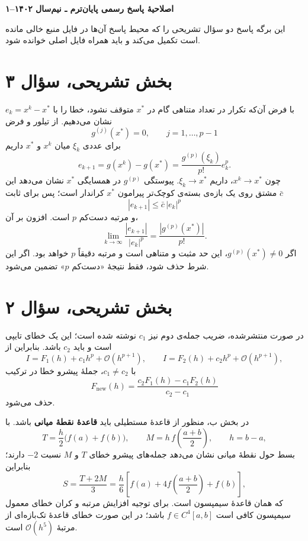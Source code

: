 \documentclass[12pt]{article}
\begin{document}
\begin{center}
  {\Large\textbf{اصلاحیهٔ پاسخ رسمی پایان‌ترم ـ نیم‌سال ۱۴۰۲--۱}}
\end{center}

این برگه پاسخ دو سؤال تشریحی را که محیط پاسخ آن‌ها در فایل  منبع خالی مانده است تکمیل می‌کند و باید همراه فایل اصلی خوانده شود.

\section*{بخش تشریحی، سؤال ۳}
با فرض آن‌که تکرار در تعداد متناهی گام در
\(x^*\)
متوقف نشود، خطا را با
\(e_k=x^k-x^*\)
نشان می‌دهیم. از تیلور و فرض
\[
 g^{(j)}(x^*)=0,\qquad j=1,\ldots,p-1
\]
برای عددی \(\xi_k\) میان \(x^k\) و \(x^*\) داریم
\[
  e_{k+1}
  =g(x^k)-g(x^*)
  =\frac{g^{(p)}(\xi_k)}{p!}e_k^p.
\]
چون \(x^k\to x^*\)، داریم \(\xi_k\to x^*\). پیوستگی \(g^{(p)}\) در همسایگی \(x^*\) نشان می‌دهد این مشتق روی یک بازه‌ی بسته‌ی کوچک‌تر پیرامون \(x^*\) کراندار است؛ پس برای ثابت \(\bar c\)
\[
  |e_{k+1}|\leq \bar c\,|e_k|^p
\]
و مرتبه دست‌کم \(p\) است. افزون بر آن،
\[
  \lim_{k\to\infty}
  \frac{|e_{k+1}|}{|e_k|^p}
  =\frac{|g^{(p)}(x^*)|}{p!}.
\]
اگر \(g^{(p)}(x^*)\neq0\)، این حد مثبت و متناهی است و مرتبه دقیقاً \(p\) خواهد بود. اگر این شرط حذف شود، فقط نتیجهٔ «دست‌کم \(p\)» تضمین می‌شود.

\section*{بخش تشریحی، سؤال ۲}
در صورت منتشرشده، ضریب جمله‌ی دوم نیز \(c_1\) نوشته شده است؛ این یک خطای تایپی است و باید \(c_2\) باشد. بنابراین از
\[
 I=F_1(h)+c_1h^p+\mathcal O(h^{p+1}),
 \qquad
 I=F_2(h)+c_2h^p+\mathcal O(h^{p+1}),
\]
با \(c_1\neq c_2\)، جملهٔ پیشرو خطا در ترکیب
\[
  \boxed{\;
  F_{\mathrm{new}}(h)
  =\frac{c_2F_1(h)-c_1F_2(h)}{c_2-c_1}
  \;}
\]
حذف می‌شود.

در بخش ب، منظور از قاعدهٔ مستطیلی باید \textbf{قاعدهٔ نقطهٔ میانی} باشد. با
\[
 T=\frac h2\bigl(f(a)+f(b)\bigr),
 \qquad
 M=h\,f\!\left(\frac{a+b}{2}\right),
 \qquad h=b-a,
\]
بسط حول نقطهٔ میانی نشان می‌دهد جمله‌های پیشرو خطای \(T\) و \(M\) نسبت
\(-2\)
دارند؛ بنابراین
\[
  S=\frac{T+2M}{3}
   =\frac h6
     \left[
       f(a)+4f\!\left(\frac{a+b}{2}\right)+f(b)
     \right],
\]
که همان قاعدهٔ سیمپسون است. برای توجیه افزایش مرتبه و کران خطای معمول سیمپسون کافی است
\(f\in C^4[a,b]\)
باشد؛ در این صورت خطای قاعدهٔ تک‌بازه‌ای از مرتبهٔ
\(\mathcal O(h^5)\)
است.
\end{document}
